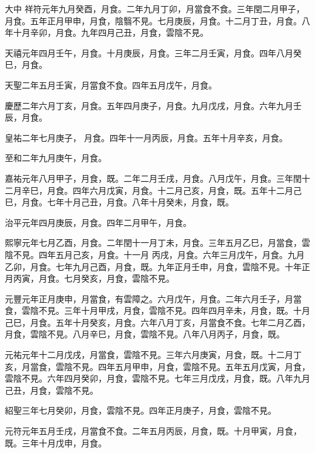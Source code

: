 \begin{pinyinscope}
 大中
 祥符元年九月癸酉，月食。二年九月丁卯，月當食不食。三年閏二月甲子，月食。五年正月甲申，月食，陰翳不見。七月庚辰，月食。十二月丁丑，月食。八年十月辛卯，月食。九年四月己丑，月食，雲陰不見。



 天禧元年四月壬午，月食。十月庚辰，月食。三年二月壬寅，月食。四年八月癸巳，月食。



 天聖二年五月壬寅，月當食不食。四年五月戊午，月食。



 慶歷二年六月丁亥，月食。五年四月庚子，月食。九月戊戌，月食。六年九月壬辰，月食。



 皇祐二年七月庚子，
 月食。四年十一月丙辰，月食。五年十月辛亥，月食。



 至和二年九月庚午，月食。



 嘉祐元年八月甲子，月食，既。二年二月壬戌，月食。八月戊午，月食。三年閏十二月辛巳，月食。四年六月戊寅，月食。十二月己亥，月食，既。五年十二月己巳，月食。七年十月己丑，月食。八年十月癸未，月食，既。



 治平元年四月庚辰，月食。四年二月甲午，月食。



 熙寧元年七月乙酉，月食。二年閏十一月丁未，月食。三年五月乙巳，月當食，雲陰不見。四年五月己亥，月食。十一月
 丙戌，月食。六年三月戊午，月食。九月乙卯，月食。七年九月己酉，月食，既。九年正月壬申，月食，雲陰不見。十年正月丙寅，月食。七月癸亥，月食，雲陰不見。



 元豐元年正月庚申，月當食，有雲障之。六月戊午，月食。二年六月壬子，月當食，雲陰不見。三年十月甲戌，月食，雲陰不見。四年四月辛未，月食，既。十月己巳，月食。五年十月癸亥，月食。六年八月丁亥，月當食不食。七年二月乙酉，月食，雲陰不見。八月辛巳，月食，雲陰不見。八年八月丙子，月食，既。



 元祐元年十二月戊戌，月當食，雲陰不見。三年六月庚寅，月食，既。十二月丁亥，月當食，雲陰不見。四年五月甲申，月食，雲陰不見。五年五月戊寅，月食，雲陰不見。六年四月癸卯，月食，雲陰不見。七年三月戊戌，月食，既。八年九月己丑，月食，雲陰不見。



 紹聖三年七月癸卯，月食，雲陰不見。四年正月庚子，月食，雲陰不見。



 元符元年五月壬戌，月當食不食。二年五月丙辰，月食，既。十月甲寅，月食，既。三年十月戊申，月食。




\end{pinyinscope}

